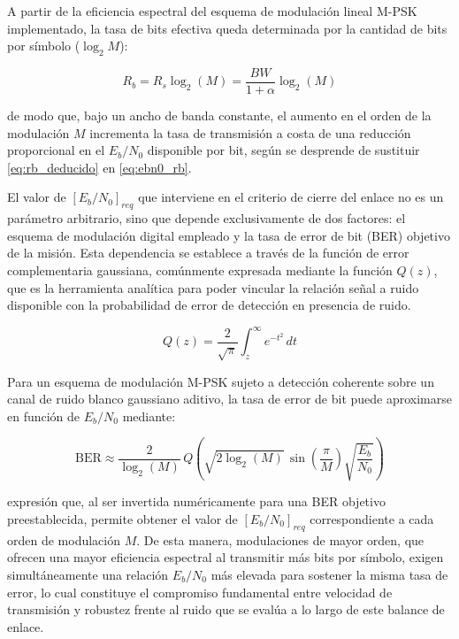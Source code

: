 A partir de la eficiencia espectral del esquema de modulación lineal M-PSK implementado, la tasa de bits efectiva queda determinada por la cantidad de bits por símbolo ($\log_{2}M$):

\begin{equation}
    R_b = R_s \log_{2}(M) = \frac{BW}{1 + \alpha} \log_{2}(M)
    \label{eq:rb_deducido}
\end{equation}

de modo que, bajo un ancho de banda constante, el aumento en el orden de la modulación $M$ incrementa la tasa de transmisión a costa de una reducción proporcional en el $E_b/N_0$ disponible por bit, según se desprende de sustituir \eqref{eq:rb_deducido} en \eqref{eq:ebn0_rb}.

El valor de $[E_b/N_0]_{req}$ que interviene en el criterio de cierre del enlace no es un parámetro arbitrario, sino que depende exclusivamente de dos factores: el esquema de modulación digital empleado y la tasa de error de bit (BER) objetivo de la misión. Esta dependencia se establece a través de la función de error complementaria gaussiana, comúnmente expresada mediante la función $Q(z)$, que es la herramienta analítica para poder vincular la relación señal a ruido disponible con la probabilidad de error de detección en presencia de ruido.

\begin{equation}
    Q(z) = \frac{2}{\sqrt{\pi}} \int_{z}^{\infty} e^{-t^2}\, dt
    \label{eq:funcion_q}
\end{equation}

Para un esquema de modulación M-PSK sujeto a detección coherente sobre un canal de ruido blanco gaussiano aditivo, la tasa de error de bit puede aproximarse en función de $E_b/N_0$ mediante:

\begin{equation}
    \text{BER} \approx \frac{2}{\log_{2}(M)}\, Q\!\left( \sqrt{2 \log_{2}(M)} \, \sin\!\left(\frac{\pi}{M}\right) \sqrt{\frac{E_b}{N_0}} \right)
    \label{eq:ber_mpsk}
\end{equation}

expresión que, al ser invertida numéricamente para una BER objetivo preestablecida, permite obtener el valor de $[E_b/N_0]_{req}$ correspondiente a cada orden de modulación $M$. De esta manera, modulaciones de mayor orden, que ofrecen una mayor eficiencia espectral al transmitir más bits por símbolo, exigen simultáneamente una relación $E_b/N_0$ más elevada para sostener la misma tasa de error, lo cual constituye el compromiso fundamental entre velocidad de transmisión y robustez frente al ruido que se evalúa a lo largo de este balance de enlace.

